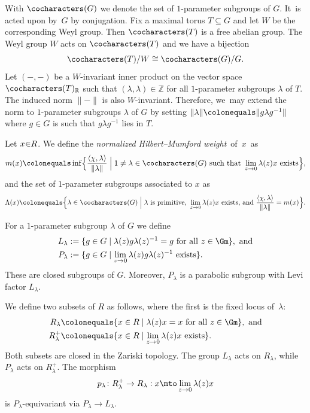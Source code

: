 With $\cocharacters(G)$ we denote the set of $1$-parameter subgroups of $G$. It~is acted upon by~$G$ by conjugation.
Fix a maximal torus $T \subseteq G$ and let $W$ be the corresponding Weyl group.
Then $\cocharacters(T)$ is a free abelian group. The Weyl group $W$ acts on $\cocharacters(T)$ and we have a bijection
\begin{equation}\label{equation:cocharacters}
\cocharacters(T)/W \cong \cocharacters(G)/G.
\end{equation}
Let $(-,-)$ be a $W$-invariant inner product on the vector space $\cocharacters(T)_\mathbb{R}$
such that $(\lambda,\lambda) \in \mathbb{Z}$ for all $1$-parameter subgroups $\lambda$ of $T$.
The induced norm $\|{-}\|$ is also $W$\nobreakdash-invariant.
Therefore, we~may extend the norm to $1$-parameter subgroups $\lambda$ of $G$
by setting $\|\lambda\|\colonequals\|g\lambda g^{-1}\|$ where $g \in G$ is such that $g\lambda g^{-1}$ lies in $T$.

\begin{definition}
Let $x \mkern-4mu\in\mkern-5mu R$. We define the \emph{normalized Hilbert--Mumford weight}~of~$x$~as
\begin{equation*}
m(x)\colonequals \inf\Bigl\{ \frac{\langle\chi,\lambda\rangle}{\|\lambda\|}\Bigm| 1 \neq \lambda \in \cocharacters(G) \text{ such that } \lim_{z\to 0} \lambda(z)x \text{ exists}\Bigr\},
\end{equation*}
and the set of $1$-parameter subgroups associated to $x$ as
\begin{equation*}
\Lambda(x) \colonequals \Bigl\{ \lambda \in \cocharacters(G)\Bigm|\lambda \text{ is primitive, } \lim_{z\to 0} \lambda(z)x \text{ exists, and } \frac{\langle\chi,\lambda\rangle}{\|\lambda\|} = m(x) \Bigr\}.
\end{equation*}
\end{definition}

For a $1$-parameter subgroup $\lambda$ of $G$ we define
\begin{align}%
L_\lambda &:= \{ g \in G\mid \lambda(z)g\lambda(z)^{-1} = g \text{ for all } z \in \Gm \}, \text{ and}\\
P_\lambda &:= \{ g \in G\mid \lim_{z \to 0} \lambda(z)g\lambda(z)^{-1} \text{ exists}\}.
\end{align}
These are closed subgroups of $G$.
Moreover, $P_\lambda$ is a parabolic subgroup with Levi factor $L_\lambda$.

We define two subsets of $R$ as follows,
where the first is the fixed locus of~$\lambda$:
\begin{align*}
R_\lambda & \colonequals \{ x \in R \mid \lambda(z)x = x \text{ for all } z \in \Gm \}, \text{ and} \\
R_\lambda^+ & \colonequals \{ x \in R \mid \lim_{z \to 0}\lambda(z)x \text{ exists}\}.
\end{align*}
Both subsets are closed in the Zariski topology.
The group $L_\lambda$ acts on $R_\lambda$, while $P_\lambda$ acts on $R_\lambda^+$.
The morphism
\begin{equation}
\label{equation:p-lambda}
p_\lambda\colon R_\lambda^+ \to R_\lambda:x\mto\lim_{z \to 0}\lambda(z)x
\end{equation}
is $P_\lambda$-equivariant via $P_\lambda \to L_\lambda$.


